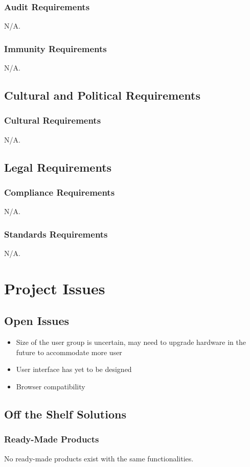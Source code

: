 \documentclass[12pt, titlepage]{article}
\begin{document}
{\subsubsection{Audit Requirements}
N/A.
\subsubsection{Immunity Requirements}
N/A.
\subsection{Cultural and Political Requirements}
\subsubsection{Cultural Requirements}
N/A.
\subsection{Legal Requirements}
\subsubsection{Compliance Requirements}
N/A.
\subsubsection{Standards Requirements}
N/A.

\section{Project Issues}
\subsection{Open Issues}
\begin{itemize}
	\item Size of the user group is uncertain, may need to upgrade hardware in the future to accommodate more user
	\item User interface has yet to be designed
	\item Browser compatibility
\end{itemize}

\subsection{Off the Shelf Solutions}
\subsubsection{Ready-Made Products}
No ready-made products exist with the same functionalities. 
}
\end{document}
